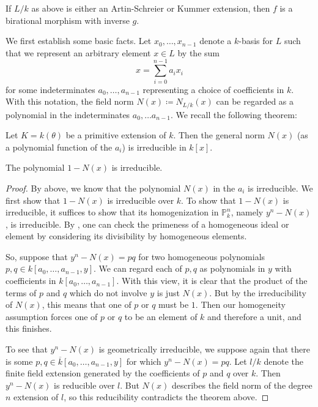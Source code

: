 \documentclass[letterpaper, openany, 10pt]{article}
\begin{document}
\begin{proposition}
	If $L/k$ as above is either an Artin-Schreier or Kummer extension, then $f$ is a birational morphism with inverse $g$.
\end{proposition}

We first establish some basic facts. Let $x_0, \ldots, x_{n-1}$ denote a $k$-basis for $L$ such that we represent an arbitrary element $x \in L$ by the sum
\[
	x = \sum_{i=0}^{n-1} a_i x_i
\]
for some indeterminates $a_0, \ldots, a_{n-1}$ representing a choice of coefficients in $k$. With this notation, the field norm $N(x) \coloneqq N_{L/k}(x)$ can be regarded as a polynomial in the indeterminates $a_0, \ldots a_{n-1}$. We recall the following theorem:

\begin{theorem}
	Let $K = k(\theta)$ be a primitive extension of $k$. Then the general norm $N(x)$ (as a polynomial function of the $a_i$) is irreducible in $k[x]$.
\end{theorem}

\begin{lemma}
	The polynomial $1 - N(x)$ is irreducible.
\end{lemma}

\begin{proof}
	By \cite[Theorem 1]{flanders} above, we know that the polynomial $N(x)$ in the $a_i$ is irreducible. We first show that $1-N(x)$ is irreducible over $k$. To show that $1 - N(x)$ is irreducible, it suffices to show that its homogenization in $\mathbb{P}_k^n$, namely $y^n - N(x)$, is irreducible. By \cite[Exercise 4.5.F(c)]{vakil}, one can check the primeness of a homogeneous ideal or element by considering its divisibility by homogeneous elements.

	So, suppose that $y^n - N(x) = pq$ for two homogeneous polynomials $p,q \in k[a_0, \ldots, a_{n-1}, y]$. We can regard each of $p,q$ as polynomials in $y$ with coefficients in $k[a_0, \ldots, a_{n-1}]$. With this view, it is clear that the product of the terms of $p$ and $q$ which do not involve $y$ is just $N(x)$. But by the irreducibility of $N(x)$, this means that one of $p$ or $q$ must be $1$. Then our homogeneity assumption forces one of $p$ or $q$ to be an element of $k$ and therefore a unit, and this finishes.

	To see that $y^n - N(x)$ is geometrically irreducible, we suppose again that there is some $p,q \in \overline{k}[a_0, \ldots, a_{n-1}, y]$ for which $y^n - N(x) = pq$. Let $l/k$ denote the finite field extension generated by the coefficients of $p$ and $q$ over $k$. Then $y^n - N(x)$ is reducible over $l$. But $N(x)$ describes the field norm of the degree $n$ extension of $l$, so this reducibility contradicts the theorem above.
\end{proof}
\end{document}
